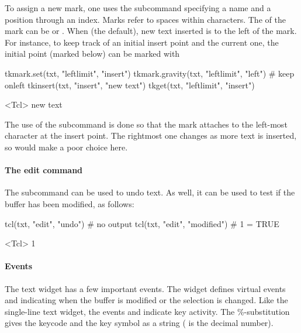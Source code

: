 To assign a new mark, one uses the 
subcommand specifying a name and a position through an index. Marks
refer to spaces within characters. The  of the mark can
be  or . When  (the default), new
text inserted is to the left of the mark. For instance, to keep track
of an initial insert point and the current one, the initial point
(marked  below) can be marked with
\begin{Schunk}
\begin{Sinput}
 tkmark.set(txt, "leftlimit", "insert")
 tkmark.gravity(txt, "leftlimit", "left")    # keep onleft
 tkinsert(txt, "insert", "new text")
 tkget(txt, "leftlimit", "insert")
\end{Sinput}
\begin{Soutput}
<Tcl> new text 
\end{Soutput}
\end{Schunk}
%
The use of the subcommand  is done so
that the mark attaches to the left-most character at the insert
point. The rightmost one changes as more text is inserted, so would
make a poor choice here.


\paragraph{The edit command}
The subcommand  can be used to undo text. As
well, it can be used to test if the buffer has been modified, as
follows:
\begin{Schunk}
\begin{Sinput}
 tcl(txt, "edit", "undo")                  # no output
 tcl(txt, "edit", "modified")              # 1 = TRUE
\end{Sinput}
\begin{Soutput}
<Tcl> 1 
\end{Soutput}
\end{Schunk}



\paragraph{Events}
The text widget has a few important events.  The widget defines
virtual events  and
 indicating when the buffer is modified
or the selection is changed. Like the single-line text widget, the
events  and  indicate
key activity. The \%-substitution  gives the keycode and
 the key symbol as a string ( is the decimal number).



